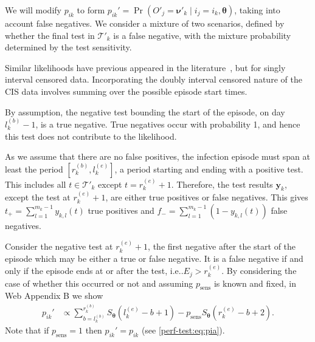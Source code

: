 \documentclass[referee,useAMS,usenatbib]{biom}
\makeatletter
\DeclareMathOperator{\prob}{\mathrm{Pr}}
\renewcommand{\vec}[1]{\bm{#1}}
\newcommand{\psens}{p_\text{sens}}
\newcommand{\sched}{\mathcal{T}}
\DeclareRobustCommand\onedot{\futurelet\@let@token\@onedot}
\def\@onedot{\ifx\@let@token.\else.\null\fi\xspace}
\def\ie{i.e\onedot} \def\Ie{{I.e}\onedot}
\makeatother
\begin{document}
We will modify $p_{ik}$ to form $p_{ik}' = \prob(O'_j = \vec{\nu}'_k \mid i_j = i_k, \vec{\theta})$, taking into account false negatives.
We consider a mixture of two scenarios, defined by whether the final test in $\sched'_{k}$ is a false negative, with the mixture probability determined by the test sensitivity.

Similar likelihoods have previous appeared in the literature~\citep[e.g.][eq.\ (2)]{piresIntervalMisclassify}, but for singly interval censored data.
Incorporating the doubly interval censored nature of the CIS data involves summing over the possible episode start times.


By assumption, the negative test bounding the start of the episode, on day $l_k^{(b)}-1$, is a true negative.
True negatives occur with probability 1, and hence this test does not contribute to the likelihood.

As we assume that there are no false positives, the infection episode must span at least the period $[r^{(b)}_k, l^{(e)}_k]$, a period starting and ending with a positive test.
This includes all $t \in \sched'_k$ except $t = r_k^{(e)}+1$.
Therefore, the test results $\vec{y}_k$, except the test at $r_k^{(e)}+1$, are either true positives or false negatives.
This gives $t_+ = \sum_{l=1}^{m_k-1} y_{k,l}(t)$ true positives and $f_- = \sum_{l=1}^{m_k-1} (1 - y_{k,l}(t))$ false negatives.

Consider the negative test at $r_k^{(e)}+1$, the first negative after the start of the episode which may be either a true or false negative.
It is a false negative if and only if the episode ends at or after the test, \ie $E_j > r_k^{(e)}$.
By considering the case of whether this occurred or not and assuming $\psens$ is known and fixed, in Web Appendix B we show
\begin{align}
p_{ik}'
&\propto \sum_{b = l_k^{(b)}}^{r_k^{(b)}} S_{\vec{\theta}}(l_k^{(e)} - b + 1) - p_\text{sens} S_{\vec{\theta}}(r_k^{(e)} - b + 2).
\label{imperf-test:eq:pia-prime-constant}
\end{align}
Note that if $p_\text{sens} = 1$ then $p_{ik}' = p_{ik}$ (see \cref{perf-test:eq:pia}).
\end{document}
